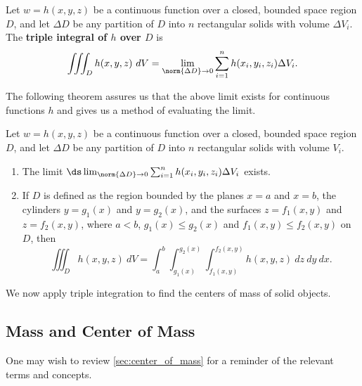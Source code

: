 {Let $w=h(x,y,z)$ be a continuous function over a closed, bounded space region $D$, and let $\Delta D$ be any partition of $D$ into $n$ rectangular solids with volume $\Delta V_i$. The \textbf{triple integral of $h$ over $D$} is
\[
\iiint_Dh(x,y,z)\ dV = \lim_{\norm{\Delta D}\to 0}\sum_{i=1}^n h(x_i,y_i,z_i)\Delta V_i.
\]}

The following theorem assures us that the above limit exists for continuous functions $h$ and gives us a method of evaluating the limit.

{Let $w=h(x,y,z)$ be a continuous function over a closed, bounded space region $D$, and let $\Delta D$ be any partition of $D$ into $n$ rectangular solids with volume $V_i$.

\begin{enumerate}
\item		The limit $\ds \lim_{\norm{\Delta D}\to 0}\sum_{i=1}^n h(x_i,y_i,z_i)\Delta V_i$ exists.

\item		If $D$ is defined as the region bounded by the planes $x=a$ and $x=b$, the cylinders $y=g_1(x)$ and $y=g_2(x)$, and the surfaces $z=f_1(x,y)$ and $z=f_2(x,y)$, where $a<b$, $g_1(x)\leq g_2(x)$ and $f_1(x,y)\leq f_2(x,y)$ on $D$, then
	\[\iiint_D h(x,y,z)\ dV = \int_a^b\int_{g_1(x)}^{g_2(x)}\int_{f_1(x,y)}^{f_2(x,y)} h(x,y,z)\ dz\ dy\ dx.\]

\end{enumerate}}

We now apply triple integration to find the centers of mass of solid objects.

\subsection{Mass and Center of Mass}

One may wish to review \autoref{sec:center_of_mass} for a reminder of the relevant terms and concepts. 

